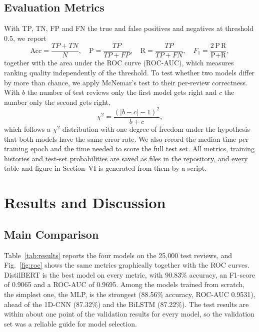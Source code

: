 \documentclass[conference,onecolumn,a4paper,10pt]{IEEEtran}
\begin{document}
\subsection{Evaluation Metrics}
With TP, TN, FP and FN the true and false positives and negatives at threshold 0.5, we report
\begin{equation}
\text{Acc}=\frac{TP+TN}{N},\quad \text{P}=\frac{TP}{TP+FP},\quad \text{R}=\frac{TP}{TP+FN},\quad F_1=\frac{2\,\text{P}\,\text{R}}{\text{P}+\text{R}},
\end{equation}
together with the area under the ROC curve (ROC-AUC), which measures ranking quality independently of the threshold. To test whether two models differ by more than chance, we apply McNemar's test to their per-review correctness. With $b$ the number of test reviews only the first model gets right and $c$ the number only the second gets right,
\begin{equation}
\chi^2=\frac{(|b-c|-1)^2}{b+c},
\end{equation}
which follows a $\chi^2$ distribution with one degree of freedom under the hypothesis that both models have the same error rate. We also record the median time per training epoch and the time needed to score the full test set. All metrics, training histories and test-set probabilities are saved as files in the repository, and every table and figure in Section~VI is generated from them by a script.

\section{Results and Discussion}

\subsection{Main Comparison}
Table~\ref{tab:results} reports the four models on the 25,000 test reviews, and Fig.~\ref{fig:roc} shows the same metrics graphically together with the ROC curves. DistilBERT is the best model on every metric, with 90.83\% accuracy, an F1-score of 0.9065 and a ROC-AUC of 0.9695. Among the models trained from scratch, the simplest one, the MLP, is the strongest (88.56\% accuracy, ROC-AUC 0.9531), ahead of the 1D-CNN (87.32\%) and the BiLSTM (87.22\%). The test results are within about one point of the validation results for every model, so the validation set was a reliable guide for model selection.
\end{document}

